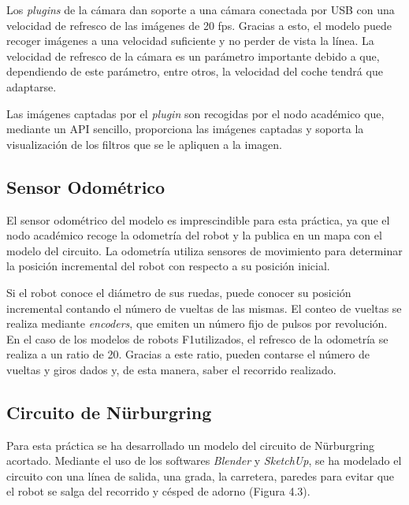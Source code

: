 Los \textit{plugins} de la cámara dan soporte a una cámara conectada por USB con una velocidad de refresco de las imágenes de 20 fps. Gracias a esto, el modelo puede recoger imágenes a una velocidad suficiente y no perder de vista la línea. La velocidad de refresco de la cámara es un parámetro importante debido a que, dependiendo de este parámetro, entre otros, la velocidad del coche tendrá que adaptarse.

Las imágenes captadas por el \textit{plugin} son recogidas por el nodo académico que, mediante un API sencillo, proporciona las imágenes captadas y soporta la visualización de los filtros que se le apliquen a la imagen.

\subsection{Sensor Odométrico}
El sensor odométrico del modelo es imprescindible para esta práctica, ya que el nodo académico recoge la odometría del robot y la publica en un mapa con el modelo del circuito. La odometría utiliza sensores de movimiento para determinar la posición  incremental del robot con respecto a su posición inicial.

Si el robot conoce el diámetro de sus ruedas, puede conocer su posición incremental contando el número de vueltas de las mismas. El conteo de vueltas se realiza mediante \textit{encoders}, que emiten un número fijo de pulsos por revolución. En el caso de los modelos de robots F1utilizados, el refresco de la odometría se realiza a un ratio de 20. Gracias a este ratio, pueden contarse el número de vueltas y giros dados y, de esta manera, saber el recorrido realizado.

\subsection{Circuito de Nürburgring}
Para esta práctica se ha desarrollado un modelo del circuito de Nürburgring acortado. Mediante el uso de los softwares \textit{Blender} y \textit{SketchUp}, se ha modelado el circuito con una línea de salida, una grada, la carretera, paredes para evitar que el robot se salga del recorrido y césped de adorno (Figura 4.3).

